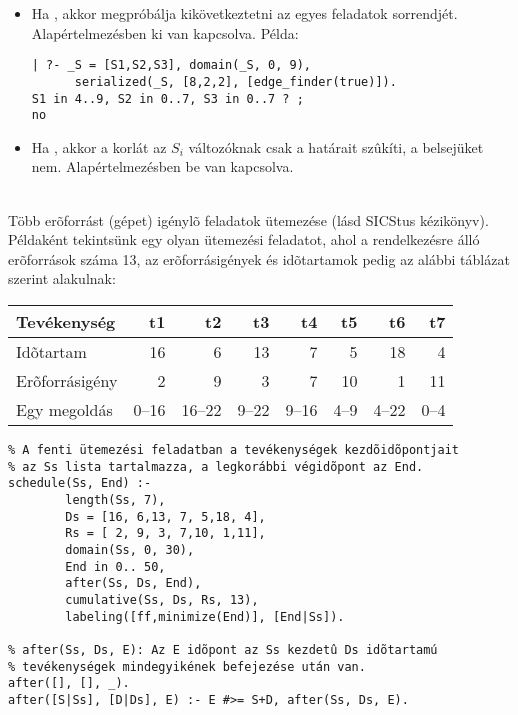 \begin{itemize}
\item {}
          Ha  , akkor megpróbálja kikövetkeztetni az egyes
          feladatok sorrendjét. Alapértelmezésben ki van kapcsolva. Példa:
\begin{verbatim}
| ?- _S = [S1,S2,S3], domain(_S, 0, 9),
      serialized(_S, [8,2,2], [edge_finder(true)]).
S1 in 4..9, S2 in 0..7, S3 in 0..7 ? ;
no
\end{verbatim}

\item {}
          Ha  , akkor a korlát az $S_i$ változóknak
          csak a határait szûkíti, a belsejüket nem. Alapértelmezésben be van kapcsolva.

\end{itemize}

\medskip

{} \\
Több erõforrást (gépet) igénylõ feladatok ütemezése (lásd SICStus kézikönyv).
\br
Példaként tekintsünk egy olyan ütemezési feladatot, ahol a rendelkezésre álló
erõforrások száma 13, az erõforrásigények és idõtartamok pedig az alábbi táblázat
szerint alakulnak:

\begin{center}
\begin{tabular}{|l|r|r|r|r|r|r|r|}
\hline
Tevékenység               & t1   & t2    & t3   & t4   & t5   & t6   & t7 \\ 
\hline                                                         
Idõtartam                 & 16   & 6     & 13   & 7    & 5    & 18   & 4 \\  
Erõforrásigény            & 2    & 9     & 3    & 7    &10    & 1    &11\\   
\hline
\hline
Egy megoldás              &0--16 &16--22 &9--22 &9--16 &4--9  &4--22 &0--4\\
\hline
\end{tabular}
\end{center}

\begin{verbatim}
% A fenti ütemezési feladatban a tevékenységek kezdõidõpontjait
% az Ss lista tartalmazza, a legkorábbi végidõpont az End.
schedule(Ss, End) :-
        length(Ss, 7),
        Ds = [16, 6,13, 7, 5,18, 4],
        Rs = [ 2, 9, 3, 7,10, 1,11],
        domain(Ss, 0, 30),
        End in 0.. 50,
        after(Ss, Ds, End),
        cumulative(Ss, Ds, Rs, 13),
        labeling([ff,minimize(End)], [End|Ss]).

% after(Ss, Ds, E): Az E idõpont az Ss kezdetû Ds idõtartamú 
% tevékenységek mindegyikének befejezése után van.
after([], [], _).
after([S|Ss], [D|Ds], E) :- E #>= S+D, after(Ss, Ds, E).
\end{verbatim}

